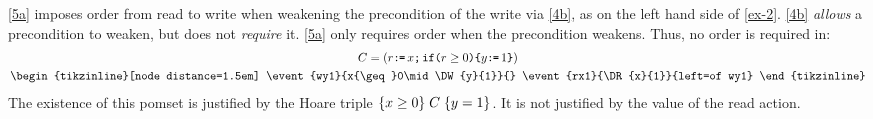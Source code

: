 \ref{5a} imposes order from read to write when weakening the
precondition of the write via \ref{4b}, as on the left hand side of
\eqref{ex-2}.
\ref{4b} \emph{allows} a precondition to weaken, but does not \emph{require} it.
\ref{5a} only requires order when the precondition weakens.
Thus, no order is required in: %
\begin{gather*}
  \aCmd=(r\GETS x\SEMI\IF{r\geq0}\THEN y\GETS1 \FI)
  \\
  \nonumber
  \hbox{\begin{tikzinline}[node distance=1.5em]
      \event{wy1}{x{\geq}0\mid\DW{y}{1}}{}
      \event{rx1}{\DR{x}{1}}{left=of wy1}
    \end{tikzinline}}
\end{gather*}
The existence of this pomset is justified
by the Hoare triple $\{x\geq0\}\allowbreak\;C\;\allowbreak\{y=1\}$.  It is not justified by the value of the read
action.  

